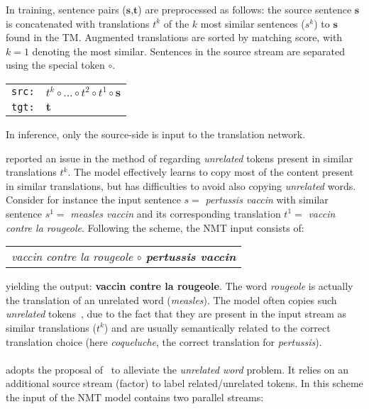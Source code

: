 In training, sentence pairs ($\textbf{s}$,$\textbf{t}$) are preprocessed as follows: the source sentence $\textbf{s}$ is concatenated with translations $t^k$ of the $k$ most similar sentences ($s^k$) to $\textbf{s}$ found in the TM. Augmented translations are sorted by matching score, with $k=1$ denoting the most similar. Sentences in the source stream are separated using the special token $\circ$.

\begin{center}
\begin{tabular}{ll}
\texttt{src:} & $t^{k} \circ ... \circ t^{2} \circ t^{1} \circ \textbf{s}$ \\
\texttt{tgt:} & $\textbf{t}$%
\end{tabular}
\end{center}
\noindent In inference, only the source-side is input to the translation network.

\citet{xu20boosting} reported an issue in the method of \citet{bulte19neural} regarding {\em unrelated} tokens present in similar translations $t^k$. The model effectively learns to copy most of the content present in similar translations, but has difficulties to avoid also copying {\em unrelated} words. Consider for instance the input sentence $s=$ {\it pertussis vaccin} with similar sentence $s^1=$ {\it measles vaccin} and its corresponding translation $t^1=$ {\it vaccin contre la rougeole}. Following the  scheme, the NMT input consists of:
\begin{center}
\begin{tabular}{c}
\it vaccin contre la rougeole $\circ$ {\bf pertussis vaccin} \\
\end{tabular}
\end{center}
\noindent yielding the output: {\bf vaccin contre la rougeole}.
%
The word {\it rougeole} is actually the translation of an unrelated word ({\it measles}). The model often copies such {\em unrelated} tokens~\citep{xu20boosting}, due to the fact that they are present in the input stream as similar translations ($t^k$) and are usually semantically related to the correct translation choice (here {\it coqueluche}, the correct translation for {\it pertussis}).

\paragraph{} adopts the proposal of~\citet{xu20boosting} to alleviate the {\em unrelated word} problem. It relies on an additional source stream (factor) to label related/unrelated tokens. In this scheme the input of the NMT model contains two parallel streams:

